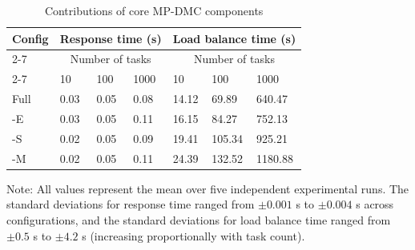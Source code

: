 \documentclass[twoside,twocolumn]{article}
\begin{document}
\begin{table}[H]
    \centering
    \setlength{\tabcolsep}{4pt}%
    \caption{Contributions of core MP-DMC components}
    \label{Table:4}
    \begin{tabularx}{\columnwidth}{@{}XXXXXXX@{}}
    \toprule[0.75pt]
    \multirow{3}{*}{Config} 
    & \multicolumn{3}{c}{Response time (s)} 
    & \multicolumn{3}{c}{Load balance time (s)} \\
    \cline{2-7}
    & \multicolumn{3}{c}{Number of tasks} 
    & \multicolumn{3}{c}{Number of tasks} \\
    \cline{2-7}
    & 10 & 100 & 1000 
    & 10 & 100 & 1000 \\
    \midrule[0.5pt]
    Full 
    & 0.03 & 0.05 & 0.08 
    & 14.12 & 69.89 & 640.47 \\
    -E 
    & 0.03 & 0.05 & 0.11 
    & 16.15 & 84.27 & 752.13 \\
    -S 
    & 0.02 & 0.05 & 0.09 
    & 19.41 & 105.34 & 925.21 \\
    -M 
    & 0.02 & 0.05 & 0.11 
    & 24.39 & 132.52 & 1180.88 \\
    \bottomrule[0.75pt]
    \end{tabularx}
    \vspace{0.4em}
    \parbox{\columnwidth}{\footnotesize Note: All values represent the mean over five independent experimental runs. The standard deviations for response time ranged from $\pm 0.001$ s to $\pm 0.004$ s across configurations, and the standard deviations for load balance time ranged from $\pm 0.5$ s to $\pm 4.2$ s (increasing proportionally with task count).}
\end{table}
\end{document}
